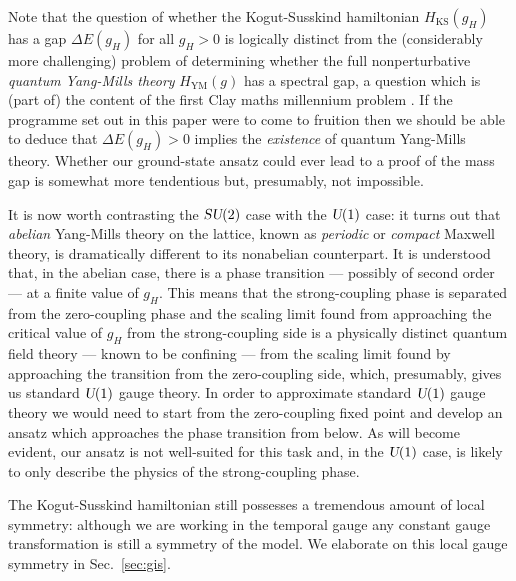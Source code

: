 \documentclass[twocolumn,lengthcheck,superscriptaddress]{revtex4-1}
\def\su2{\textsl{SU}(2)}
\def\uone{\textsl{U}(1)}
\theoremstyle{definition}
\theoremstyle{remark}
\begin{document}
Note that the question of whether the Kogut-Susskind hamiltonian $H_{\text{KS}}(g_H)$ has a gap $\Delta E(g_H)$ for all $g_H > 0$ is logically distinct from the (considerably more challenging) problem of determining whether the full nonperturbative \emph{quantum Yang-Mills theory} $H_{\text{YM}}(g)$ has a spectral gap, a question which is (part of) the content of the first Clay maths millennium problem \cite{cmproblem:1st}. If the programme set out in this paper were to come to fruition then we should be able to deduce that $\Delta E(g_H) >0$ implies the \emph{existence} of quantum Yang-Mills theory. Whether our ground-state ansatz could ever lead to a proof of the mass gap is somewhat more tendentious but, presumably, not impossible.

It is now worth contrasting the $\su2$ case with the $\uone$ case: it turns out that \emph{abelian} Yang-Mills theory on the lattice, known as \emph{periodic} or \emph{compact} Maxwell theory, is dramatically different \cite{polyakov:1975a, villain:1975a, polyakov:1977a, banks:1977a, peskin:1978a, kogut:2004a} to its nonabelian counterpart. It is understood that, in the abelian case, there is a phase transition --- possibly of second order --- at a finite value of $g_H$. This means that the strong-coupling phase is separated from the zero-coupling phase and the scaling limit found from approaching the critical value of $g_H$ from the strong-coupling side is a physically distinct quantum field theory --- known to be confining --- from the scaling limit found by approaching the transition from the zero-coupling side, which, presumably, gives us standard $\uone$ gauge theory. In order to approximate standard $\uone$ gauge theory we would need to start from the zero-coupling fixed point and develop an ansatz which approaches the phase transition from below. As will become evident, our ansatz is not well-suited for this task and, in the $\uone$ case, is likely to only describe the physics of the strong-coupling phase. 

The Kogut-Susskind hamiltonian still possesses a tremendous amount of local symmetry: although we are working in the temporal gauge any constant gauge transformation is still a symmetry of the model. We elaborate on this local gauge symmetry in Sec.~\ref{sec:gis}.
\end{document}
